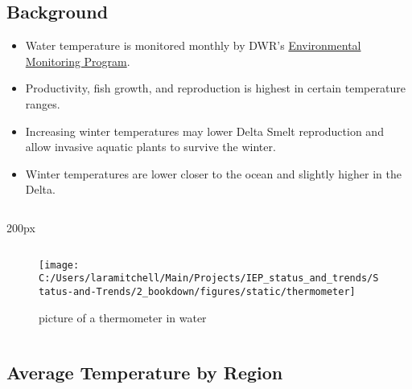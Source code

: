 \documentclass[
]{book}
\providecommand{\tightlist}{%
  \setlength{\itemsep}{0pt}\setlength{\parskip}{0pt}}
\begin{document}
\begin{columns-nocenter}

\begin{column}{0.7\textwidth}
\begin{column}

\hypertarget{background-1}{%
\subsection{Background}\label{background-1}}

\begin{itemize}
\tightlist
\item
  Water temperature is monitored monthly by DWR's \href{https://emp.baydeltalive.com/wiki/12297}{Environmental Monitoring Program}.
\item
  Productivity, fish growth, and reproduction is highest in certain temperature ranges.
\item
  Increasing winter temperatures may lower Delta Smelt reproduction and allow invasive aquatic plants to survive the winter.
\item
  Winter temperatures are lower closer to the ocean and slightly higher in the Delta.
\end{itemize}

\end{column}
\end{column}

\begin{column}{200px\textwidth}
\begin{column}

\begin{figure}

{\centering \texttt{[image: C:/Users/laramitchell/Main/Projects/IEP\_status\_and\_trends/Status-and-Trends/2\_bookdown/figures/static/thermometer]} 

}

\caption{picture of a thermometer in water}\label{fig:unnamed-chunk-150}
\end{figure}

\end{column}
\end{column}

\end{columns-nocenter}

\hypertarget{average-temperature-by-region}{%
\subsection{Average Temperature by Region}\label{average-temperature-by-region}}
\end{document}
